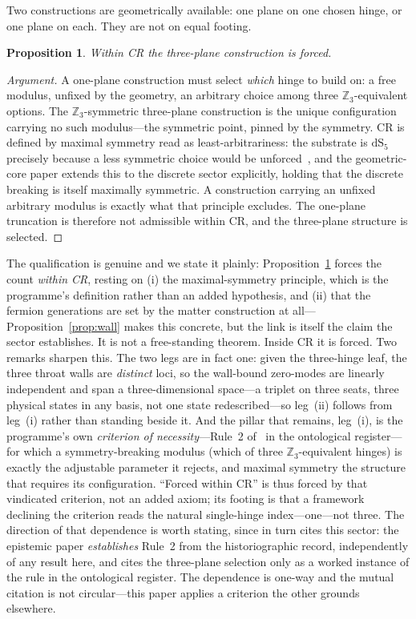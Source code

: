 \documentclass[11pt]{article}
\newcommand{\dS}{\mathrm{dS}}
\newtheorem{proposition}{Proposition}
\begin{document}
Two constructions are geometrically available: one plane on one chosen hinge, or one plane on each. They are not on equal footing.
\begin{proposition}\label{prop:forced}
Within CR the three-plane construction is forced.
\end{proposition}
\begin{proof}[Argument]
A one-plane construction must select \emph{which} hinge to build on: a free modulus, unfixed by the geometry, an arbitrary choice among three $\mathbb{Z}_3$-equivalent options. The $\mathbb{Z}_3$-symmetric three-plane construction is the unique configuration carrying no such modulus---the symmetric point, pinned by the symmetry. CR is defined by maximal symmetry read as least-arbitrariness: the substrate is $\dS_5$ precisely because a less symmetric choice would be unforced~\cite{JanzenGeometricCore,JanzenCRframework}, and the geometric-core paper extends this to the discrete sector explicitly, holding that the discrete breaking is itself maximally symmetric. A construction carrying an unfixed arbitrary modulus is exactly what that principle excludes. The one-plane truncation is therefore not admissible within CR, and the three-plane structure is selected.
\end{proof}
The qualification is genuine and we state it plainly: Proposition~\ref{prop:forced} forces the count \emph{within CR}, resting on (i) the maximal-symmetry principle, which is the programme's definition rather than an added hypothesis, and (ii) that the fermion generations are set by the matter construction at all---Proposition~\ref{prop:wall} makes this concrete, but the link is itself the claim the sector establishes. It is not a free-standing theorem. Inside CR it is forced. Two remarks sharpen this. The two legs are in fact one: given the three-hinge leaf, the three throat walls are \emph{distinct} loci, so the wall-bound zero-modes are linearly independent and span a three-dimensional space---a triplet on three seats, three physical states in any basis, not one state redescribed---so leg~(ii) follows from leg~(i) rather than standing beside it. And the pillar that remains, leg~(i), is the programme's own \emph{criterion of necessity}---Rule~2 of~\cite{JanzenShadowExistence} in the ontological register---for which a symmetry-breaking modulus (which of three $\mathbb{Z}_3$-equivalent hinges) is exactly the adjustable parameter it rejects, and maximal symmetry the structure that requires its configuration. ``Forced within CR'' is thus forced by that vindicated criterion, not an added axiom; its footing is that a framework declining the criterion reads the natural single-hinge index---one---not three. The direction of that dependence is worth stating, since \cite{JanzenShadowExistence} in turn cites this sector: the epistemic paper \emph{establishes} Rule~2 from the historiographic record, independently of any result here, and cites the three-plane selection only as a worked instance of the rule in the ontological register. The dependence is one-way and the mutual citation is not circular---this paper applies a criterion the other grounds elsewhere.
\end{document}

